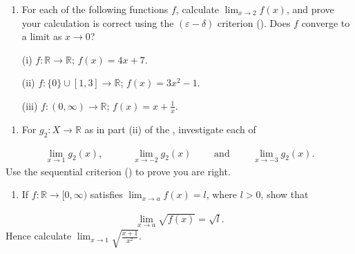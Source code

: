 \documentclass[letterpaper,10pt,english]{jupyterBook}
\begin{document}
\label{\detokenize{Problems:id3}}\begin{enumerate}
%
\setcounter{enumi}{2}
\item {} 
\sphinxAtStartPar
{} For each of the following functions \(f\), calculate \(\lim_{x\rightarrow 2}f(x)\), and prove your calculation is correct using the \((\varepsilon-\delta)\) criterion (). Does \(f\) converge to a limit as \(x\rightarrow 0\)?

\sphinxAtStartPar
(i) \(f:\mathbb{R}\to\mathbb{R}\); \(f(x)=4x+7\).

\sphinxAtStartPar
(ii) \(f:\{0\}\cup[1,3]\to\mathbb{R}\); \(f(x)=3x^2-1\).

\sphinxAtStartPar
(iii) \(f:(0,\infty)\to\mathbb{R}\); \(f(x)=x+\frac{1}{x}\).

\end{enumerate}
\label{\detokenize{Problems:id4}}\begin{enumerate}
%
\setcounter{enumi}{3}
\item {} 
\sphinxAtStartPar
For \(g_2:X\to \mathbb{R}\) as in part (ii) of the {\hyperref[\detokenize{Problems:id1}]{}}, investigate each of

\end{enumerate}
\begin{equation*}
\begin{split}
\lim_{x \rightarrow 1}g_{2}(x), \hspace{3em} \lim_{x \rightarrow -2}g_{2}(x) \hspace{2em} \text{ and } \hspace{2em} \lim_{x \rightarrow -3}g_{2}(x).
\end{split}
\end{equation*}
\sphinxAtStartPar
Use the sequential criterion () to prove you are right.

\label{\detokenize{Problems:id5}}\begin{enumerate}
%
\setcounter{enumi}{4}
\item {} 
\sphinxAtStartPar
If \(f: \mathbb{R} \rightarrow [0, \infty)\) satisfies \(\displaystyle\lim_{x \rightarrow a} f(x) = l\), where \(l > 0\), show that

\end{enumerate}
\begin{equation*}
\begin{split}
\lim_{x \rightarrow a} \sqrt{f(x)} = \sqrt{l}.
\end{split}
\end{equation*}
\sphinxAtStartPar
Hence calculate \(\displaystyle\lim_{x \rightarrow 1}\sqrt{\displaystyle\frac{x+1}{x^{2}}}\).
\end{document}
